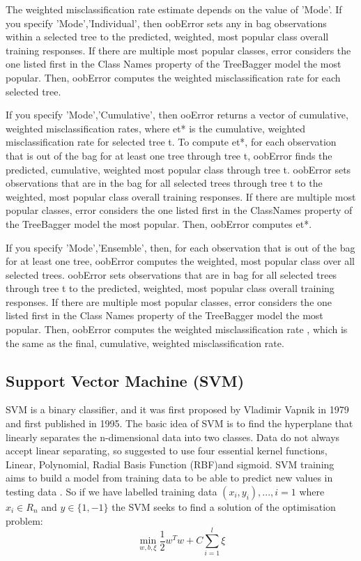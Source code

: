The weighted misclassification rate estimate depends on the value of 'Mode'.
If you specify 'Mode','Individual', then oobError sets any in bag observations within a selected tree to the predicted, weighted, most popular class overall training responses. If there are multiple most popular classes, error considers the one listed first in the Class Names property of the TreeBagger model the most popular. Then, oobError computes the weighted misclassification rate for each selected tree.

If you specify 'Mode','Cumulative', then ooError returns a vector of cumulative, weighted misclassification rates, where et* is the cumulative, weighted misclassification rate for selected tree t. To compute et*, for each observation that is out of the bag for at least one tree through tree t, oobError finds the predicted, cumulative, weighted most popular class through tree t. oobError sets observations that are in the bag for all selected trees through tree t to the weighted, most popular class overall training responses. If there are multiple most popular classes, error considers the one listed first in the ClassNames property of the TreeBagger model the most popular. Then, oobError computes et*.


If you specify 'Mode','Ensemble', then, for each observation that is out of the bag for at least one tree, oobError computes the weighted, most popular class over all selected trees. oobError sets observations that are in bag for all selected trees through tree t to the predicted, weighted, most popular class overall training responses. If there are multiple most popular classes, error considers the one listed first in the Class Names property of the TreeBagger model the most popular. Then, oobError computes the weighted misclassification rate , which is the same as the final, cumulative, weighted misclassification rate.

\subsection{Support Vector Machine (SVM)}
SVM is a binary classifier, and it was first proposed by Vladimir Vapnik in 1979 and first published in 1995. The basic idea of SVM is to find the hyperplane that linearly separates the n-dimensional data into two classes. Data do not always accept linear separating,  so  \citet{hsu2003practical} suggested to use four essential kernel functions, Linear, Polynomial, Radial Basis Function (RBF)and sigmoid. SVM training aims to build a model from training data to be able to predict new values in testing data \cite{candra2017emotion}.
So if we have labelled training data $(x_i,y_i),..., i =1$ where $x_i \in R_n$ and $y \in \{1,-1\}$ the SVM seeks to find a solution of the optimisation problem:
\begin{equation}
\min_{w,b,\xi} \frac{1}{2} w^T w + C \sum_{i=1}^{l} \xi
\end{equation} 

